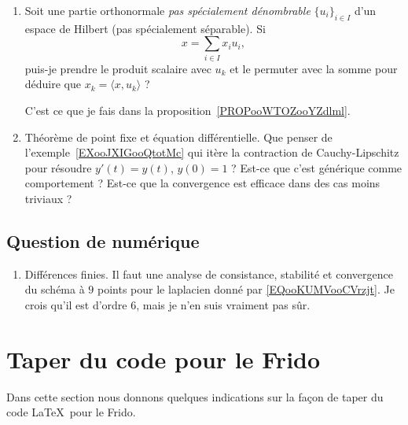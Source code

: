 \begin{enumerate}
    \item
        Soit une partie orthonormale \emph{pas spécialement dénombrable} \( \{ u_i \}_{i\in I}\) d'un espace de Hilbert (pas spécialement séparable). Si
        \begin{equation}
            x=\sum_{i\in I}x_iu_i,
        \end{equation}
        puis-je prendre le produit scalaire avec \( u_{k}\) et le permuter avec la somme pour déduire que \( x_k=\langle x, u_k\rangle \) ?

        C'est ce que je fais dans la proposition~\ref{PROPooWTOZooYZdlml}.
    \item
        Théorème de point fixe et équation différentielle. Que penser de l'exemple~\ref{EXooJXIGooQtotMc} qui itère la contraction de Cauchy-Lipschitz pour résoudre \( y'(t)=y(t)\), \( y(0)=1\) ? Est-ce que c'est générique comme comportement ? Est-ce que la convergence est efficace dans des cas moins triviaux ?
\end{enumerate}

\subsection{Question de numérique}

\begin{enumerate}
    \item
        Différences finies. Il faut une analyse de consistance, stabilité et convergence du schéma à \( 9\) points pour le laplacien donné par \eqref{EQooKUMVooCVrzjt}. Je crois qu'il est d'ordre \( 6\), mais je n'en suis vraiment pas sûr.
\end{enumerate}

\section{Taper du code pour le Frido}

Dans cette section nous donnons quelques indications sur la façon de taper du code \LaTeX\ pour le Frido.

